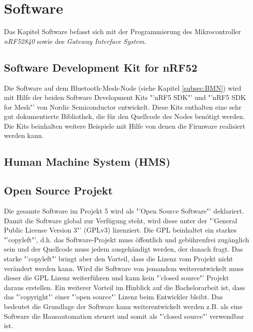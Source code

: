 \clearpage
\section{Software}\label{sec:Software}
Das Kapitel Software befasst sich mit der Programmierung des Mikrocontroller \textit{nRF52840} sowie des \textit{Gateway Interface System}.

\subsection{Software Development Kit for nRF52}\label{subsec:SDK}
Die Software auf dem Bluetooth-Mesh-Node (siehe Kapitel \ref{subsec:BMN})  wird mit Hilfe der beiden Software Development Kits "'nRF5 SDK"'\cite{nordic_semiconductor_nrf5_2019} und "'nRF5 SDK for Mesh"'\cite{nordic_semiconductor_nrf5_2019-1} von Nordic Semiconductor entwickelt. Diese Kits enthalten eine sehr gut dokumentierte Bibliothek, die für den Quellcode des Nodes benötigt werden. Die Kits beinhalten weitere Beispiele mit Hilfe von denen die Firmware realisiert werden kann.

\subsection{Human Machine System (HMS)}\label{subsec:HMS_SW}

\subsection{Open Source Projekt}\label{subsec:OSP}
Die gesamte Software im Projekt 5 wird als "'Open Source Software"' deklariert. Damit die Software global zur Verfügung steht, wird diese unter der "'General Public License Version 3"' (GPLv3) lizenziert. Die GPL beinhaltet ein starkes "'copyleft"', d.h. das Software-Projekt muss öffentlich und gebührenfrei zugänglich sein und der Quellcode muss jedem ausgehändigt werden, der danach fragt. Das starke "'copyleft"' bringt aber den Vorteil, dass die Lizenz vom Projekt nicht verändert werden kann. Wird die Software von jemandem weiterentwickelt muss dieser die GPL Lizenz weiterführen und kann kein "'closed source"' Projekt daraus erstellen. Ein weiterer Vorteil im Hinblick auf die Bachelorarbeit ist, dass das "'copyright"' einer "'open source"' Lizenz beim Entwickler bleibt. Das bedeutet die Grundlage der Software kann weiterentwickelt werden z.B. als eine Software die Hausautomation steuert und somit als "'closed source"' verwendbar ist.\cite{jaeger_was_2018}